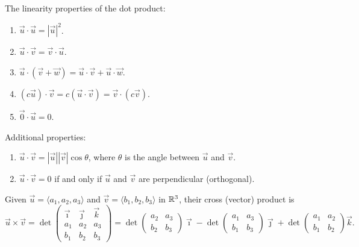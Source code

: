 \begin{facts}
	The linearity properties of the dot product:
	\begin{enumerate}
		\item $\vec{u} \cdot \vec{u} = {|\vec{u}|}^2$.
		\item $\vec{u} \cdot \vec{v} = \vec{v} \cdot \vec{u}$.
		\item $\vec{u} \cdot (\vec{v} + \vec{w}) = \vec{u} \cdot \vec{v} + \vec{u}
			\cdot \vec{w}$.
		\item $(c \vec{u}) \cdot \vec{v} = c(\vec{u} \cdot \vec{v}) = \vec{v} \cdot
			(c \vec{v})$.
		\item $\vec{0} \cdot \vec{u} = 0$.
	\end{enumerate}
	Additional properties:
	\begin{enumerate}
		\item $\vec{u} \cdot \vec{v} = |\vec{u}| |\vec{v}| \cos \theta$, where
			$\theta$ is the angle between $\vec{u}$ and $\vec{v}$.
		\item $\vec{u} \cdot \vec{v} = 0$ if and only if $\vec{u}$ and $\vec{v}$ are
			perpendicular (orthogonal).
	\end{enumerate}
\end{facts}

\begin{definition}
	Given $\vec{u} = \langle a_1, a_2, a_3 \rangle$ and $\vec{v} = \langle b_1,
	b_2, b_3 \rangle$ in ${\mathbb{R}}^3$, their cross (vector) product is
	\[
		\vec{u} \times \vec{v} = \det
		\begin{pmatrix}
			\vec{\imath} & \vec{\jmath} & \vec{k} \\
			a_1 & a_2 & a_3 \\
			b_1 & b_2 & b_3
		\end{pmatrix}
		= \det
		\begin{pmatrix}
			a_2 & a_3 \\
			b_2 & b_3
		\end{pmatrix}
		\vec{\imath} -
		\det
		\begin{pmatrix}
			a_1 & a_3 \\
			b_1 & b_3
		\end{pmatrix}
		\vec{\jmath} +
		\det
		\begin{pmatrix}
			a_1 & a_2 \\
			b_1 & b_2
		\end{pmatrix}
		\vec{k}.
	\]
\end{definition}

